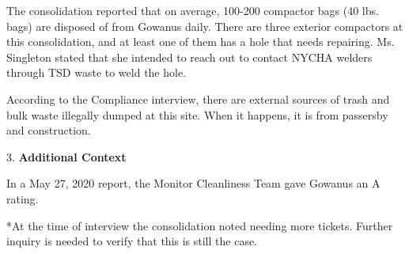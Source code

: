 The consolidation reported that on average, 100-200 compactor bags (40 lbs. bags) are disposed of from Gowanus daily. There are three exterior compactors at this consolidation, and at least one of them has a hole that needs repairing. Ms. Singleton stated that she intended to reach out to contact NYCHA welders through TSD waste to weld the hole.

According to the Compliance interview, there are external sources of trash and bulk waste illegally dumped at this site. When it happens, it is from passersby and construction.

3. \textbf{Additional Context}

In a May 27, 2020 report, the Monitor Cleanliness Team gave Gowanus an A rating. 

*At the time of interview the consolidation noted needing more tickets. Further inquiry is needed to verify that this is still the case.